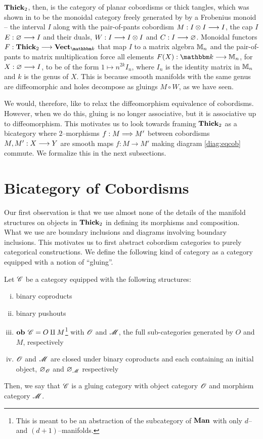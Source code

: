 \documentclass[./Thick_TQFTs_and_Quantum_Information.tex]{subfiles}
\begin{document}
$\textbf{Thick}_2$, then, is the category of planar cobordisms or thick tangles, which
was shown in \cite{NonCommTQFT} to be the monoidal category freely generated by
by a Frobenius monoid -- the interval $I$ along with the pair-of-pants cobordism
$M : I \otimes I \stackrel{}{\longrightarrow} I$, the cap $I$ $E : \varnothing \stackrel{}{\longrightarrow} I$ and their duals,
$W : I \stackrel{}{\longrightarrow} I \otimes I$ and $C : I \stackrel{}{\longrightarrow} \varnothing$. Monoidal functors
$F : \Thick_2 \to \Vect_{\K}$ that map $I$ to a matrix algebra $\mathbb{M}_n$
and the pair-of-pants to matrix multiplication force all elements
$F(X) : \K \to \M_n$, for $X : \varnothing \stackrel{}{\longrightarrow} I$, to be of the form
$1 \mapsto n^{2k}I_n$, where $I_n$ is the identity matrix in $\mathbb{M}_n$ and $k$ is
the genus of $X$. This is because smooth manifolds with the same genus are
diffeomorphic and holes decompose as gluings $M \circ W$, as we have seen.

We would, therefore, like to relax the diffeomorphism equivalence of cobordisms.
However, when we do this, gluing is no longer associative, but it is associative
up to diffeomorphism.  This motivates us to look towards framing $\textbf{Thick}_2$ as a
bicategory where $2$--morphisms $f : M \stackrel{}{\Longrightarrow} M'$ between cobordisms $M,
M' : X \stackrel{}{\longrightarrow} Y$ are smooth maps $f : M \to M'$ making diagram \eqref{diag:eqcob}
commute. We formalize this in the next subsections.

\section{Bicategory of Cobordisms}

Our first observation is that we use almost none of the details of the manifold
structures on objects in $\textbf{Thick}_2$ in defining its morphisms and composition.
What we use are boundary inclusions and diagrams involving boundary inclusions.
This motivates us to first abstract cobordism categories to purely categorical
constructions. We define the following kind of category as a category equipped
with a notion of ``gluing''.

\begin{defn}
Let $\mathscr{C}$ be a category equipped with the following structures:
\begin{enumerate}[(i)]
\setlength{\itemsep}{0pt}
\item binary coproducts
\item binary pushouts
\item $\textbf{ob } \mathscr{C} = O \amalg M$\footnote{This is meant to be an abstraction of
the subcategory of $\textbf{Man}$ with only $d$-- and $(d + 1)$--manifolds.} with
$\mathscr{O}$ and $\mathscr{M}$, the full sub-categories generated by $O$ and $M$,
respectively
\item $\mathscr{O}$ and $\mathscr{M}$ are closed under binary coproducts and each containing
an initial object, $\varnothing_{\mathscr{O}}$ and $\varnothing_{\mathscr{M}}$ respectively
\end{enumerate}
Then, we say that $\mathscr{C}$ is a gluing category with object category
$\mathscr{O}$ and morphism category $\mathscr{M}$.
\end{defn}
\end{document}
